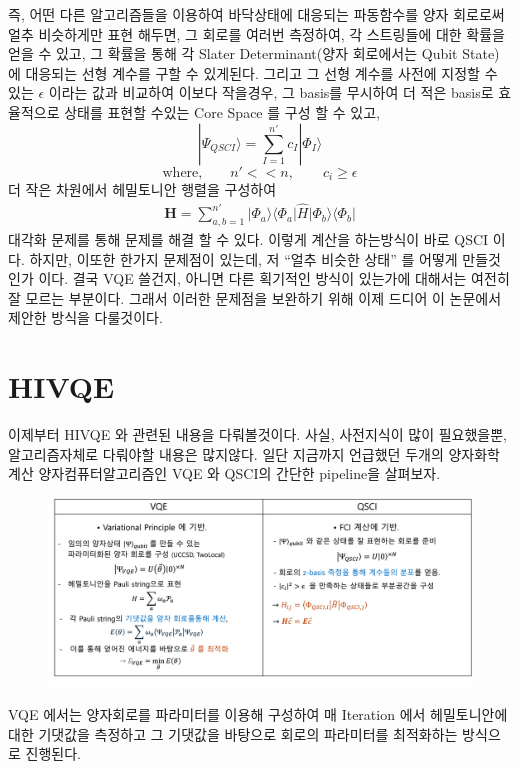 \documentclass[11pt]{article}
\begin{document}
즉, 어떤 다른 알고리즘들을 이용하여 바닥상태에 대응되는 파동함수를 양자 회로로써 얼추 비슷하게만 표현 해두면, 그 회로를 여러번 측정하여, 각 스트링들에 대한 확률을 얻을 수 있고, 
그 확률을 통해 각 Slater Determinant(양자 회로에서는 Qubit State)에 대응되는 선형 계수를 구할 수 있게된다. 
그리고 그 선형 계수를 사전에 지정할 수 있는 \(\epsilon\) 이라는 값과 비교하여 이보다 작을경우, 그 basis를 무시하여 더 적은 basis로 효율적으로 상태를 표현할 수있는 Core Space 를 구성 할 수 있고, 
\[
|\Psi_{QSCI}\rangle = \sum_{I=1}^{n'} c_I |\Phi_I\rangle 
\]
\[
\text{where,} \qquad n'<<n, \qquad c_i \geq \epsilon
\]
더 작은 차원에서 헤밀토니안 행렬을 구성하여 
\begin{align*}
\mathbf{H} = \sum_{a,b=1}^{n'} \vert \Phi_a \rangle \langle \Phi_a \vert \hat{H} \vert \Phi_b \rangle \langle \Phi_b \vert
\end{align*}
대각화 문제를 통해 문제를 해결 할 수 있다. 이렇게 계산을 하는방식이 바로 QSCI 이다. 하지만, 이또한 한가지 문제점이 있는데, 
저 \enquote{얼추 비슷한 상태} 를 어떻게 만들것인가 이다. 결국 VQE 쓸건지, 아니면 다른 획기적인 방식이 있는가에 대해서는 여전히 잘 모르는 부분이다. 
그래서 이러한 문제점을 보완하기 위해 이제 드디어 이 논문에서 제안한 방식을 다룰것이다. 

\section{HIVQE}
이제부터 HIVQE 와 관련된 내용을 다뤄볼것이다. 사실, 사전지식이 많이 필요했을뿐, 알고리즘자체로 다뤄야할 내용은 많지않다. 일단 지금까지 언급했던 두개의 양자화학계산 양자컴퓨터알고리즘인 VQE 와 QSCI의 간단한 pipeline을 살펴보자. 
\begin{figure}[H]
  \centering
  \includegraphics[width=\textwidth]{fig/VQE,QSCI2.png}
  \label{fig:example2}
\end{figure}
VQE 에서는 양자회로를 파라미터를 이용해 구성하여 매 Iteration 에서 헤밀토니안에 대한 기댓값을 측정하고 그 기댓값을 바탕으로 회로의 파라미터를 최적화하는 방식으로 진행된다. 
\end{document}
